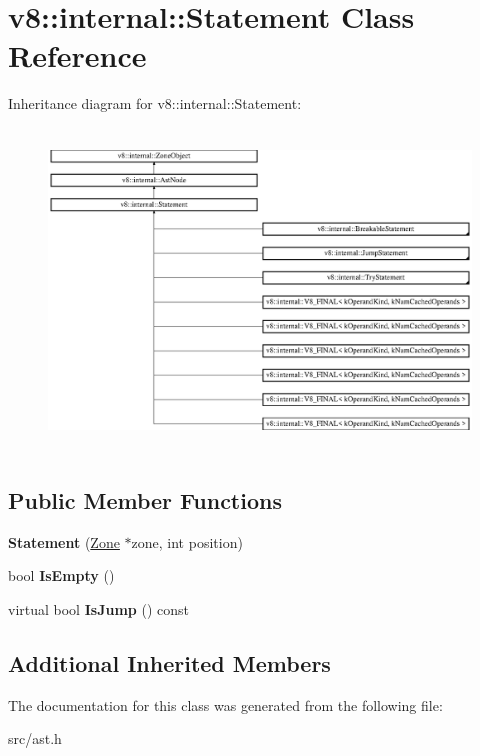 \hypertarget{classv8_1_1internal_1_1_statement}{}\section{v8\+:\+:internal\+:\+:Statement Class Reference}
\label{classv8_1_1internal_1_1_statement}
Inheritance diagram for v8\+:\+:internal\+:\+:Statement\+:\begin{figure}[H]
\begin{center}
\leavevmode
\includegraphics[height=8.571428cm]{classv8_1_1internal_1_1_statement}
\end{center}
\end{figure}
\subsection*{Public Member Functions}
\begin{DoxyCompactItemize}
\item 
\hypertarget{classv8_1_1internal_1_1_statement_a4ad4746acdde76b4fc471b3cb8cb8900}{}{\bfseries Statement} (\hyperlink{classv8_1_1internal_1_1_zone}{Zone} $\ast$zone, int position)\label{classv8_1_1internal_1_1_statement_a4ad4746acdde76b4fc471b3cb8cb8900}

\item 
\hypertarget{classv8_1_1internal_1_1_statement_a8cfc3abbe3a50c3015fbef78229bbd9b}{}bool {\bfseries Is\+Empty} ()\label{classv8_1_1internal_1_1_statement_a8cfc3abbe3a50c3015fbef78229bbd9b}

\item 
\hypertarget{classv8_1_1internal_1_1_statement_a36e6af4fa712db69316a227ec8570cf3}{}virtual bool {\bfseries Is\+Jump} () const \label{classv8_1_1internal_1_1_statement_a36e6af4fa712db69316a227ec8570cf3}

\end{DoxyCompactItemize}
\subsection*{Additional Inherited Members}


The documentation for this class was generated from the following file\+:\begin{DoxyCompactItemize}
\item 
src/ast.\+h\end{DoxyCompactItemize}
